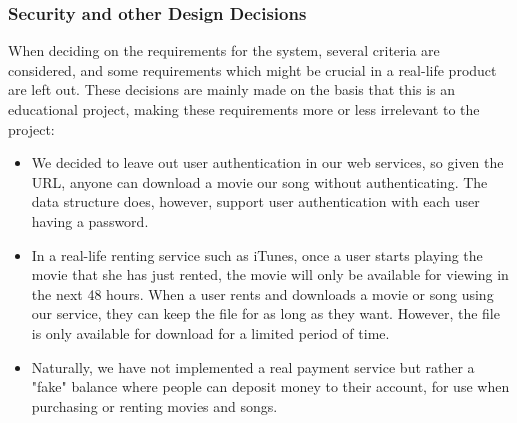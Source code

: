 \subsubsection{Security and other Design Decisions}
When deciding on the requirements for the system, several criteria are considered, and some requirements which might be crucial in a real-life product are left out. These decisions are mainly made on the basis that this is an educational project, making these requirements more or less irrelevant to the project:
\begin{itemize}
\item We decided to leave out user authentication in our web services, so given the URL, anyone can download a movie our song without authenticating. The data structure does, however, support user authentication with each user having a password.
\item In a real-life renting service such as iTunes, once a user starts playing the movie that she has just rented, the movie will only be available for viewing in the next 48 hours. When a user rents and downloads a movie or song using our service, they can keep the file for as long as they want. However, the file is only available for download for a limited period of time.
\item Naturally, we have not implemented a real payment service but rather a "fake" balance where people can deposit money to their account, for use when purchasing or renting movies and songs.
\end{itemize}